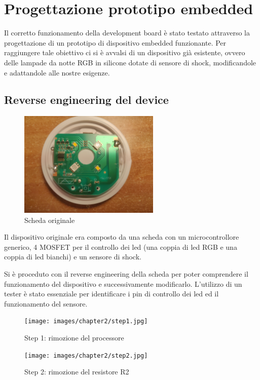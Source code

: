 \section{Progettazione prototipo embedded}

Il corretto funzionamento della development board è stato testato attraverso la progettazione di un prototipo di 
dispositivo embedded funzionante.
Per raggiungere tale obiettivo ci si è avvalsi di un dispositivo già esistente, 
ovvero delle lampade da notte RGB in silicone dotate di sensore di shock, modificandole e adattandole alle nostre esigenze.

\subsection{Reverse engineering del device}

\begin{figure}[H]
  \centering
  \includegraphics[width=0.6\textwidth]{images/chapter2/step0.jpg}
  \caption{Scheda originale}
  \label{fig:original_pcb}
\end{figure}

Il dispositivo originale era composto da una scheda con un microcontrollore generico, 4 MOSFET per il controllo dei led 
(una coppia di led RGB e una coppia di led bianchi) e un sensore di shock.

Si è proceduto con il reverse engineering della scheda per poter comprendere il funzionamento del dispositivo e successivamente modificarlo.
L'utilizzo di un tester è stato essenziale per identificare i pin di controllo dei led ed il funzionamento del sensore.

\begin{figure}[H]
  \centering
  \begin{minipage}[b]{0.45\textwidth}
    \texttt{[image: images/chapter2/step1.jpg]}
    \caption{Step 1: rimozione del processore}
    \label{fig:step1}
  \end{minipage}
  \hfill
  \begin{minipage}[b]{0.45\textwidth}
    \texttt{[image: images/chapter2/step2.jpg]}
    \caption{Step 2: rimozione del resistore R2}
    \label{fig:step2}
    \end{minipage}
\end{figure}

